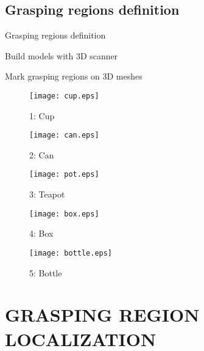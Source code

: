 \documentclass[xcolor=table,compress,blue]{beamer}
\begin{document}
\subsection{Grasping regions definition}
\begin{frame}{Grasping regions definition}
	\begin{exampleblock}{Build models with 3D scanner}
		
	\end{exampleblock}
	\begin{exampleblock}{Mark grasping regions on 3D meshes}
		\begin{figure}[htpb]
			\centering
			\begin{minipage}[b]{0.8in}
				\centerline{\texttt{[image: cup.eps]}}
				\centerline{\small{1: Cup}}
			\end{minipage}
			\begin{minipage}[b]{0.8in}
				\centerline{\texttt{[image: can.eps]}}
				\centerline{\small{2: Can}}
			\end{minipage}
			\begin{minipage}[b]{0.8in}
				\centerline{\texttt{[image: pot.eps]}}
				\centerline{\small{3: Teapot}}
			\end{minipage}
			\begin{minipage}[b]{0.8in}
				\centerline{\texttt{[image: box.eps]}}
				\centerline{\small{4: Box}}
			\end{minipage}
			\begin{minipage}[b]{0.8in}
				\centerline{\texttt{[image: bottle.eps]}}
				\centerline{\small{5: Bottle}}
			\end{minipage}
			\label{fig:Models} %
		\end{figure}
	\end{exampleblock}
\end{frame}



\section{GRASPING REGION LOCALIZATION}
\end{document}
